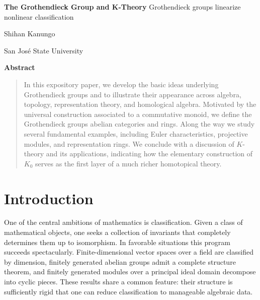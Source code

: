 \documentclass[12pt,reqno]{amsart}
\theoremstyle{plain}
\numberwithin{equation}{section}
\begin{document}
\newpage
\thispagestyle{empty}

\newpage 
\setlength{\parskip}{5pt}
\thispagestyle{empty}
\setcounter{page}{1}

\begin{center}
    {\LARGE \bf The Grothendieck Group and K-Theory} 
    \vskip 5pt
    {\normalsize Grothendieck groups linearize nonlinear classification}
    
    \vspace{0.3in}
    {\large  Shihan Kanungo} 
    
    \vspace{0.05in}
    {\small San Jos\'e State University}
\end{center}
\date{\today}

\vspace{0.2in}
\begin{center}
    {\bf Abstract}
\end{center}
\begin{quote}
    {\footnotesize In this expository paper, we develop the basic ideas underlying Grothendieck groups and to illustrate their appearance across algebra, topology, representation theory, and homological algebra. Motivated by the universal construction associated to a commutative monoid, we define the Grothendieck groups abelian categories and rings. Along the way we study several fundamental examples, including Euler characteristics, projective modules, and representation rings. We conclude with a discussion of $K$-theory and its applications, indicating how the elementary construction of $K_0$ serves as the first layer of a much richer homotopical theory.}
\end{quote} 

\setcounter{section}{0}

\vspace{5mm}
\section{Introduction}

One of the central ambitions of mathematics is classification. Given a class of mathematical objects, one seeks a collection of invariants that completely determines them up to isomorphism. In favorable situations this program succeeds spectacularly. Finite-dimensional vector spaces over a field are classified by dimension, finitely generated abelian groups admit a complete structure theorem, and finitely generated modules over a principal ideal domain decompose into cyclic pieces. These results share a common feature: their structure is sufficiently rigid that one can reduce classification to manageable algebraic data.
\end{document}
